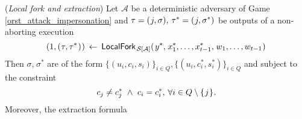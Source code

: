 \documentclass{iacrtrans}
\begin{document}
\begin{prop}\label{orst_extractability_prop}
\textup{(\textit{Local fork and extraction})}
Let $\mathcal{A}$ be a deterministic adversary of
Game \textup{\ref{orst_attack_impersonation}}
and
$\tau = (\hspace{0.5pt}j, \sigma),
\hspace{2pt}\tau^* = (\hspace{0.5pt}j, \sigma^*)$
be outputs of a non-aborting execution
\vspace{5pt}
\begin{equation*}
(
	\vspace{1pt}
	1,
	\vspace{1pt}
	(
		\hspace{0.5pt}
		\tau,
		\tau^*
		\hspace{0.5pt}
	)
	\hspace{0.5pt}
)
\hspace{2pt}
\leftarrow
\hspace{2pt}
\mathsf{LocalFork}_{
		\hspace{1pt}
    	\mathcal{S}\hspace{0pt}[
    		\hspace{0pt}
    		\mathcal{A}
    		\hspace{0pt}
    	]
    }
	(
   		\hspace{1pt}
		y ^*,
		\hspace{1pt}
		x_1^*, \dots, x_{t-1}^*,
		\hspace{1pt}
		w_1, \dots, w_{t-1}
		\hspace{0.3pt}
   	)\hspace{1pt}
\vspace{5pt}
\end{equation*}
Then $\sigma,\hspace{1pt}\sigma^*$ are of the form
$\{(u_i, c_i, s_i)\}_{i \in Q}, \{(u_i, c_i^*, s_i^*)\}_{i \in Q}$
and subject to the constraint
\vspace{5pt}
\begin{equation}\label{orst_forked_challenges}
c_j \neq c_j^*
\ \land
\ c_i = c_i^*,\hspace{2pt}
\forall i \in Q \setminus \{\hspace{0.5pt}j\hspace{0.5pt}\}
\hspace{0.5pt}.
\vspace{5pt}
\end{equation}
Moreover, the extraction formula
\vspace{5pt}
\begin{equation}\label{orst_extraction}

\end{equation}
\end{prop}
\end{document}
